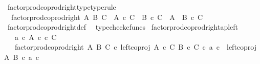 \begin{isabellebody}
\isanewline
{}\isamarkupfalse%
\ factor{\isacharunderscore}{\kern0pt}prod{\isacharunderscore}{\kern0pt}coprod{\isacharunderscore}{\kern0pt}right{\isacharunderscore}{\kern0pt}type{\isacharbrackleft}{\kern0pt}type{\isacharunderscore}{\kern0pt}rule{\isacharbrackright}{\kern0pt}{\isacharcolon}{\kern0pt}\isanewline
\ \ {\isachardoublequoteopen}factor{\isacharunderscore}{\kern0pt}prod{\isacharunderscore}{\kern0pt}coprod{\isacharunderscore}{\kern0pt}right\ A\ B\ C\ {\isacharcolon}{\kern0pt}\ {\isacharparenleft}{\kern0pt}A\ {\isasymtimes}\isactrlsub c\ C{\isacharparenright}{\kern0pt}\ {\isasymCoprod}\ {\isacharparenleft}{\kern0pt}B\ {\isasymtimes}\isactrlsub c\ C{\isacharparenright}{\kern0pt}\ {\isasymrightarrow}\ {\isacharparenleft}{\kern0pt}A\ {\isasymCoprod}\ B{\isacharparenright}{\kern0pt}\ {\isasymtimes}\isactrlsub c\ C{\isachardoublequoteclose}\isanewline
%
\isadelimproof
\ \ %
\endisadelimproof
%
\isatagproof
{}\isamarkupfalse%
\ factor{\isacharunderscore}{\kern0pt}prod{\isacharunderscore}{\kern0pt}coprod{\isacharunderscore}{\kern0pt}right{\isacharunderscore}{\kern0pt}def\ \isamarkupfalse%
\ typecheck{\isacharunderscore}{\kern0pt}cfuncs%
\endisatagproof
{\isafoldproof}%
%
\isadelimproof
\isanewline
%
\endisadelimproof
\isanewline
{}\isamarkupfalse%
\ factor{\isacharunderscore}{\kern0pt}prod{\isacharunderscore}{\kern0pt}coprod{\isacharunderscore}{\kern0pt}right{\isacharunderscore}{\kern0pt}ap{\isacharunderscore}{\kern0pt}left{\isacharcolon}{\kern0pt}\isanewline
\ \ \ {\isachardoublequoteopen}a\ {\isasymin}\isactrlsub c\ A{\isachardoublequoteclose}\ {\isachardoublequoteopen}c\ {\isasymin}\isactrlsub c\ C{\isachardoublequoteclose}\isanewline
\ \ \ {\isachardoublequoteopen}factor{\isacharunderscore}{\kern0pt}prod{\isacharunderscore}{\kern0pt}coprod{\isacharunderscore}{\kern0pt}right\ A\ B\ C\ {\isasymcirc}\isactrlsub c\ {\isacharparenleft}{\kern0pt}left{\isacharunderscore}{\kern0pt}coproj\ {\isacharparenleft}{\kern0pt}A\ {\isasymtimes}\isactrlsub c\ C{\isacharparenright}{\kern0pt}\ {\isacharparenleft}{\kern0pt}B\ {\isasymtimes}\isactrlsub c\ C{\isacharparenright}{\kern0pt}\ {\isasymcirc}\isactrlsub c\ {\isasymlangle}a{\isacharcomma}{\kern0pt}\ c{\isasymrangle}{\isacharparenright}{\kern0pt}\ {\isacharequal}{\kern0pt}\ {\isasymlangle}left{\isacharunderscore}{\kern0pt}coproj\ A\ B\ {\isasymcirc}\isactrlsub c\ a{\isacharcomma}{\kern0pt}\ c{\isasymrangle}{\isachardoublequoteclose}\isanewline
%
\isadelimproof
%
\endisadelimproof
%
\isatagproof
{}\isamarkupfalse%

\end{isabellebody}

